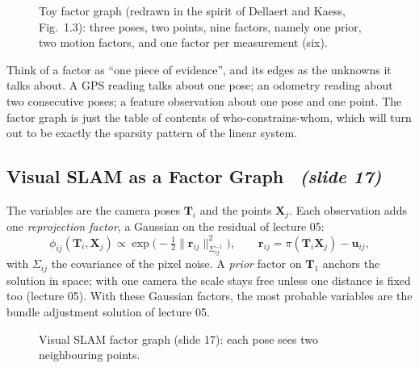 \documentclass[11pt,a4paper]{article}
\newcommand{\slrs}[1]{\texorpdfstring{\ \emph{(slide #1)}}{ (slide #1)}}
\newcommand{\bx}{\mathbf{x}}
\newcommand{\by}{\mathbf{y}}
\newcommand{\bX}{\mathbf{X}}
\newcommand{\bT}{\mathbf{T}}
\newcommand{\norm}[2]{\lVert #1\rVert_{#2}}
\begin{document}
\begin{figure}[htbp]\centering
{}
\caption{Toy factor graph (redrawn in the spirit of Dellaert and Kaess, Fig.~1.3): three poses, two points, nine factors, namely one prior, two motion factors, and one factor per measurement (six).}
\end{figure}
\begin{intuition}
Think of a factor as ``one piece of evidence'', and its edges as the unknowns it talks about. A GPS reading talks about one pose; an odometry reading about two consecutive poses; a feature observation about one pose and one point. The factor graph is just the table of contents of who-constrains-whom, which will turn out to be exactly the sparsity pattern of the linear system.
\end{intuition}

\subsection{Visual SLAM as a Factor Graph \slrs{17}}
The variables are the camera poses $\bT_i$ and the points $\bX_j$. Each observation adds one \emph{reprojection factor}, a Gaussian on the residual of lecture 05:
\[
\phi_{ij}(\bT_i,\bX_j)\propto\exp\!\Big(-\tfrac12\norm{\mathbf r_{ij}}{\Sigma_{ij}^{-1}}^2\Big),\qquad
\mathbf r_{ij}=\pi(\bT_i\bX_j)-\mathbf u_{ij},
\]
with $\Sigma_{ij}$ the covariance of the pixel noise. A \emph{prior} factor on $\bT_1$ anchors the solution in space; with one camera the scale stays free unless one distance is fixed too (lecture 05). With these Gaussian factors, the most probable variables are the bundle adjustment solution of lecture 05.

\begin{figure}[htbp]\centering
{}
\caption{Visual SLAM factor graph (slide 17): each pose sees two neighbouring points.}
\end{figure}
\end{document}
